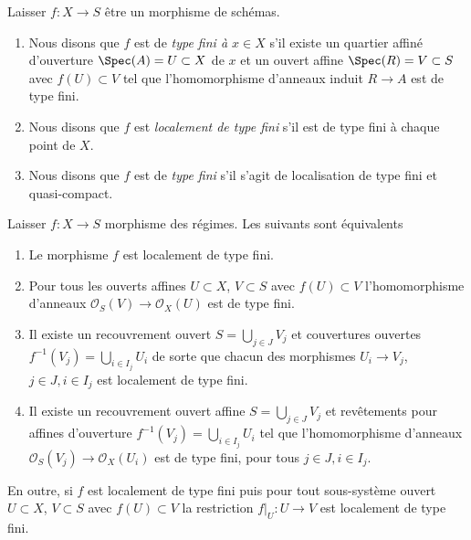 \begin{definition}

\label{definition-finite-type}

Laisser $f : X \to S$ être un morphisme de schémas.

\begin{enumerate}

\item Nous disons que $f$ est de {\it type fini à $x \in X$} s'il existe un quartier affiné d'ouverture $\Spec(A) = U \subset X$
de $x$ et un ouvert affine $\Spec(R) = V \subset S$
avec $f(U) \subset V$ tel que l'homomorphisme d'anneaux induit
$R \to A$ est de type fini.
\item Nous disons que $f$ est {\it localement de type fini} s'il est de type fini à chaque point de $X$.
\item Nous disons que $f$ est de {\it type fini} s'il s'agit de localisation de type fini et quasi-compact.

\end{enumerate}

\end{definition}

\begin{lemma}

\label{lemma-locally-finite-type-characterize}

Laisser $f : X \to S$ morphisme des régimes. Les suivants sont équivalents

\begin{enumerate}

\item Le morphisme $f$ est localement de type fini.
\item Pour tous les ouverts affines $U \subset X$, $V \subset S$
avec $f(U) \subset V$ l'homomorphisme d'anneaux
$\mathcal{O}_S(V) \to \mathcal{O}_X(U)$ est de type fini.
\item Il existe un recouvrement ouvert $S = \bigcup_{j \in J} V_j$
et couvertures ouvertes $f^{-1}(V_j) = \bigcup_{i \in I_j} U_i$ de sorte que chacun des morphismes $U_i \to V_j$, $j\in J, i\in I_j$
est localement de type fini.
\item Il existe un recouvrement ouvert affine $S = \bigcup_{j \in J} V_j$
et revêtements pour affines d'ouverture $f^{-1}(V_j) = \bigcup_{i \in I_j} U_i$ tel que l'homomorphisme d'anneaux $\mathcal{O}_S(V_j) \to \mathcal{O}_X(U_i)$ est de type fini, pour tous $j\in J, i\in I_j$.

\end{enumerate}

En outre, si $f$ est localement de type fini puis pour tout sous-système ouvert $U \subset X$, $V \subset S$ avec $f(U) \subset V$
la restriction $f|_U : U \to V$ est localement de type fini.

\end{lemma}

